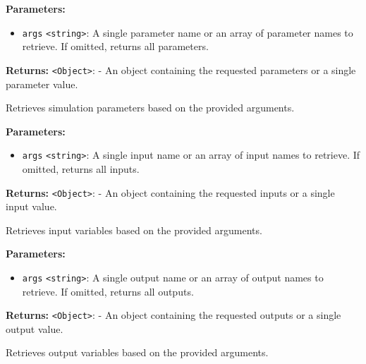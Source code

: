 \documentclass[12pt,a4paper]{article}
\begin{document}
\vspace{5mm}
\noindent {}


\noindent \textbf{Parameters:}
\begin{itemize}
  \item \texttt{args} \texttt{<string>}: A single parameter name or an array of parameter names to retrieve. If omitted, returns all parameters.
\end{itemize}

\noindent \textbf{Returns:} \texttt{<Object>}: - An object containing the requested parameters or a single parameter value.

\noindent Retrieves simulation parameters based on the provided arguments.

\vspace{5mm}
\noindent {}


\noindent \textbf{Parameters:}
\begin{itemize}
  \item \texttt{args} \texttt{<string>}: A single input name or an array of input names to retrieve. If omitted, returns all inputs.
\end{itemize}

\noindent \textbf{Returns:} \texttt{<Object>}: - An object containing the requested inputs or a single input value.

\noindent Retrieves input variables based on the provided arguments.

\vspace{5mm}
\noindent {}


\noindent \textbf{Parameters:}
\begin{itemize}
  \item \texttt{args} \texttt{<string>}: A single output name or an array of output names to retrieve. If omitted, returns all outputs.
\end{itemize}

\noindent \textbf{Returns:} \texttt{<Object>}: - An object containing the requested outputs or a single output value.

\noindent Retrieves output variables based on the provided arguments.
\end{document}
